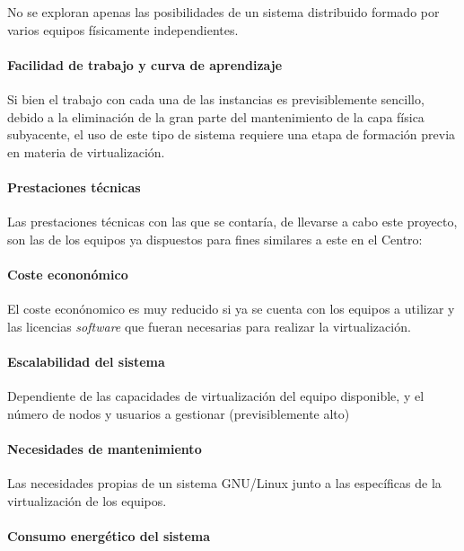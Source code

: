 No se exploran apenas las posibilidades de un sistema distribuido formado por varios equipos físicamente independientes.

\paragraph{Facilidad de trabajo y curva de aprendizaje}

Si bien el trabajo con cada una de las instancias es previsiblemente sencillo, debido a la eliminación de la gran parte del mantenimiento de la capa física subyacente, el uso de este tipo de sistema requiere una etapa de formación previa en materia de virtualización.

\paragraph{Prestaciones técnicas}

Las prestaciones técnicas con las que se contaría, de llevarse a cabo este proyecto, son las de los equipos ya dispuestos para fines similares a este en el Centro: %

\paragraph{Coste econonómico}

El coste econónomico es muy reducido si ya se cuenta con los equipos a utilizar y las licencias \textit{software} que fueran necesarias para realizar la virtualización.

\paragraph{Escalabilidad del sistema}

Dependiente de las capacidades de virtualización del equipo disponible, y el número de nodos y usuarios a gestionar (previsiblemente alto)

\paragraph{Necesidades de mantenimiento}

Las necesidades propias de un sistema GNU/Linux junto a las específicas de la virtualización de los equipos.

\paragraph{Consumo energético del sistema}
